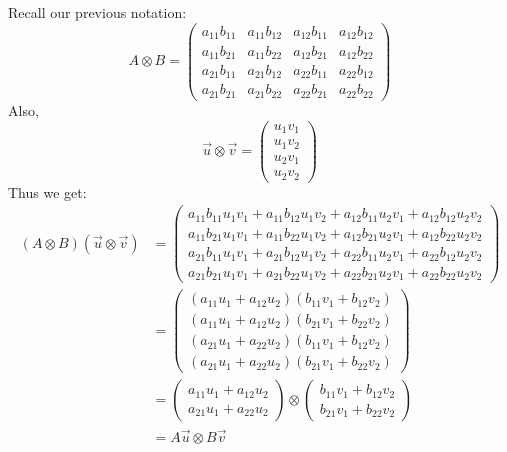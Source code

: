 \documentclass[a4paper,10pt]{hw}
\begin{document}
\subsection{}

Recall our previous notation:
$$
A \otimes B =
\begin{pmatrix}
a_{11}b_{11} & a_{11}b_{12} & a_{12}b_{11} & a_{12}b_{12} \\
a_{11}b_{21} & a_{11}b_{22} & a_{12}b_{21} & a_{12}b_{22} \\
a_{21}b_{11} & a_{21}b_{12} & a_{22}b_{11} & a_{22}b_{12} \\
a_{21}b_{21} & a_{21}b_{22} & a_{22}b_{21} & a_{22}b_{22}
\end{pmatrix}
$$
Also,
$$
\vec{u} \otimes \vec{v} = 
\begin{pmatrix} u_1 v_1 \\ u_1 v_2 \\ u_2 v_1 \\ u_2 v_2 \end{pmatrix}
$$
Thus we get:
\begin{align*}
\left(A \otimes B\right) \left(\vec{u} \otimes \vec{v}\right)
&=
\begin{pmatrix}
a_{11}b_{11}u_1v_1 + a_{11}b_{12}u_1v_2 + a_{12}b_{11}u_2v_1 + a_{12}b_{12}u_2v_2\\
a_{11}b_{21}u_1v_1 + a_{11}b_{22}u_1v_2 + a_{12}b_{21}u_2v_1 + a_{12}b_{22}u_2v_2\\
a_{21}b_{11}u_1v_1 + a_{21}b_{12}u_1v_2 + a_{22}b_{11}u_2v_1 + a_{22}b_{12}u_2v_2\\
a_{21}b_{21}u_1v_1 + a_{21}b_{22}u_1v_2 + a_{22}b_{21}u_2v_1 + a_{22}b_{22}u_2v_2
\end{pmatrix}\\
&= 
\begin{pmatrix}
(a_{11}u_1 + a_{12}u_2)(b_{11}v_1 + b_{12}v_2) \\
(a_{11}u_1 + a_{12}u_2)(b_{21}v_1 + b_{22}v_2)	\\
(a_{21}u_1 + a_{22}u_2)(b_{11}v_1 + b_{12}v_2) \\
(a_{21}u_1 + a_{22}u_2)(b_{21}v_1 + b_{22}v_2)
\end{pmatrix} \\
&=
\begin{pmatrix}
a_{11}u_1 + a_{12}u_2 \\
a_{21}u_1 + a_{22}u_2
\end{pmatrix}
\otimes
\begin{pmatrix}
b_{11}v_1 + b_{12}v_2 \\
b_{21}v_1 + b_{22}v_2
\end{pmatrix} \\
&= A\vec{u} \otimes B\vec{v}
\end{align*}
\end{document}
